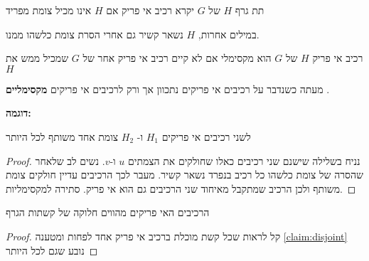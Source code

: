 \begin{definition}
תת גרף $H$ של $G$ יקרא רכיב אי פריק אם $H$ אינו מכיל צומת מפריד
\end{definition}

במילים אחרות, $H$ נשאר קשיר גם אחרי הסרת צומת כלשהו ממנו.

\begin{definition}
רכיב אי פריק $H$ של $G$ הוא מקסימלי אם לא קיים רכיב אי פריק אחר של $G$ שמכיל ממש את $H$
\end{definition}

מעתה כשנדבר על רכיבים אי פריקים נתכוון אך ורק לרכיבים אי פריקים 
\textbf{מקסימליים}
.

\textbf{דוגמה:}
\begin{center}
\end{center}

\begin{claim}
\label{claim:disjoint}
לשני רכיבים אי פריקים
$H_1$
ו-%
$H_2$
צומת אחד משותף לכל היותר
\end{claim}
\begin{proof}
נניח בשלילה שישנם שני רכיבים כאלו שחולקים את הצמתים $u$ ו-$v$.
נשים לב שלאחר שהסרה של צומת כלשהו כל רכיב בנפרד נשאר קשיר.
מעבר לכך הרכיבים עדיין חולקים צומת משותף ולכן הרכיב שמתקבל מאיחוד שני הרכיבים גם הוא אי פריק.
סתירה למקסימליות.
\end{proof}

\begin{claim}
הרכיבים האי פריקים מהווים חלוקה של קשתות הגרף
\end{claim}
\begin{proof}
קל לראות שכל קשת מוכלת ברכיב אי פריק אחד לפחות ומטענה 
\ref{claim:disjoint}
נובע שגם לכל היותר

\end{proof}

